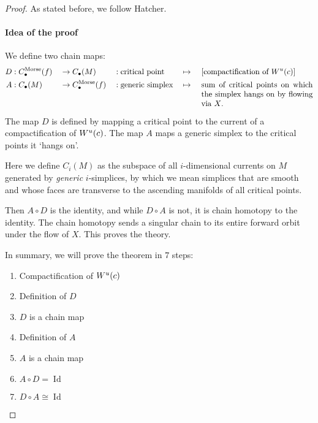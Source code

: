 \begin{proof}
    As stated before, we follow Hatcher.
    \paragraph{Idea of the proof}
    
    We define two chain maps:
    \begin{alignat*}{5}
        D&: C_\bul^{\text{Morse}}(f) &&\to  C_\bul(M)&&: \text{critical point} &&\mapsto &&\ [\text{compactification of $\unstable{c}$}]\\
        A&: C_\bul(M) &&\to  C_\bul^{\text{Morse}}(f)&&: \text{generic simplex} &&\mapsto &&\ \parbox[t][][t]{5cm}{sum of critical points on which the simplex hangs on by flowing via $X$.}
    \end{alignat*}
\begin{marginfigure}
    \centering
    \caption{The map $D$ is defined by mapping a critical point to the current of a compactification of $W^u(c)$. The map $A$ maps a generic simplex to the critical points it `hangs on'.}
    \label{fig:idea-of-the-proof-maps-a-and-d}
\end{marginfigure}

    Here we define $C_i(M)$ as the subspace of all  $i$-dimensional currents on $M$ generated by \emph{generic} $i$-simplices, by which we mean simplices that are smooth and whose faces are transverse to the ascending manifolds of all critical points.


    Then $A  \circ D$ is the identity, and while $D  \circ  A$ is not, it is chain homotopy to the identity.
    The chain homotopy sends a singular chain to its entire forward orbit under the flow of $X$.
    This proves the theory.

    In summary, we will prove the theorem in $7$ steps:
    \begin{enumerate}
        \item Compactification of $W^u(c)$
        \item Definition of $D$
        \item $D$ is a chain map
        \item Definition of $A$
        \item $A$ is a chain map
        \item $A  \circ D = \operatorname{Id}$
        \item  $D  \circ A \cong \operatorname{Id}$
    \end{enumerate}


\end{proof}
